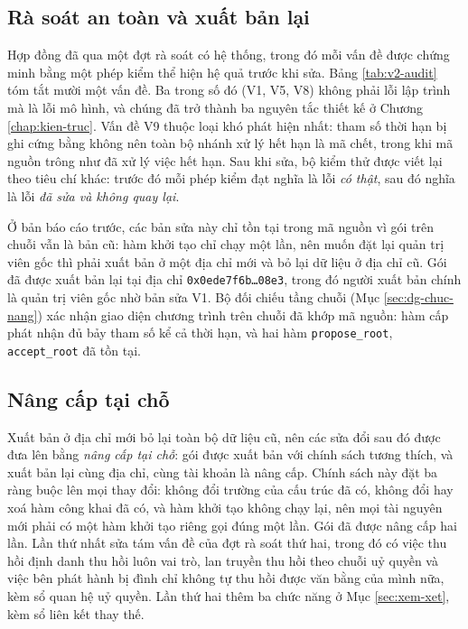 \subsection{Rà soát an toàn và xuất bản lại}

Hợp đồng đã qua một đợt rà soát có hệ thống, trong đó mỗi vấn đề được chứng minh bằng một phép kiểm thể hiện hệ quả trước khi sửa. Bảng \ref{tab:v2-audit} tóm tắt mười một vấn đề. Ba trong số đó (V1, V5, V8) không phải lỗi lập trình mà là lỗi mô hình, và chúng đã trở thành ba nguyên tắc thiết kế ở Chương \ref{chap:kien-truc}. Vấn đề V9 thuộc loại khó phát hiện nhất: tham số thời hạn bị ghi cứng bằng không nên toàn bộ nhánh xử lý hết hạn là mã chết, trong khi mã nguồn trông như đã xử lý việc hết hạn. Sau khi sửa, bộ kiểm thử được viết lại theo tiêu chí khác: trước đó mỗi phép kiểm đạt nghĩa là lỗi \emph{có thật}, sau đó nghĩa là lỗi \emph{đã sửa và không quay lại}.



Ở bản báo cáo trước, các bản sửa này chỉ tồn tại trong mã nguồn vì gói trên chuỗi vẫn là bản cũ: hàm khởi tạo chỉ chạy một lần, nên muốn đặt lại quản trị viên gốc thì phải xuất bản ở một địa chỉ mới và bỏ lại dữ liệu ở địa chỉ cũ. Gói đã được xuất bản lại tại địa chỉ \texttt{0x0ede7f6b\ldots08e3}, trong đó người xuất bản chính là quản trị viên gốc nhờ bản sửa V1. Bộ đối chiếu tầng chuỗi (Mục \ref{sec:dg-chuc-nang}) xác nhận giao diện chương trình trên chuỗi đã khớp mã nguồn: hàm cấp phát nhận đủ bảy tham số kể cả thời hạn, và hai hàm \texttt{propose\_root}, \texttt{accept\_root} đã tồn tại.

\subsection{Nâng cấp tại chỗ}
\label{sec:nang-cap}

Xuất bản ở địa chỉ mới bỏ lại toàn bộ dữ liệu cũ, nên các sửa đổi sau đó được đưa lên bằng \emph{nâng cấp tại chỗ}: gói được xuất bản với chính sách tương thích, và xuất bản lại cùng địa chỉ, cùng tài khoản là nâng cấp. Chính sách này đặt ba ràng buộc lên mọi thay đổi: không đổi trường của cấu trúc đã có, không đổi hay xoá hàm công khai đã có, và hàm khởi tạo không chạy lại, nên mọi tài nguyên mới phải có một hàm khởi tạo riêng gọi đúng một lần. Gói đã được nâng cấp hai lần. Lần thứ nhất sửa tám vấn đề của đợt rà soát thứ hai, trong đó có việc thu hồi định danh thu hồi luôn vai trò, lan truyền thu hồi theo chuỗi uỷ quyền và việc bên phát hành bị đình chỉ không tự thu hồi được văn bằng của mình nữa, kèm sổ quan hệ uỷ quyền. Lần thứ hai thêm ba chức năng ở Mục \ref{sec:xem-xet}, kèm sổ liên kết thay thế.

